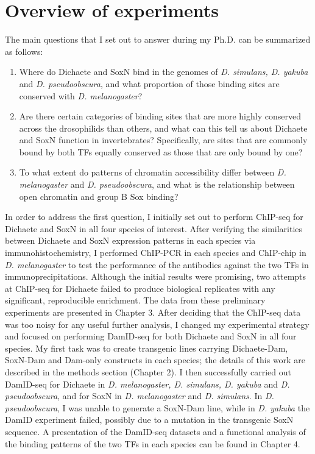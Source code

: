 \section{Overview of experiments}
The main questions that I set out to answer during my Ph.D. can be summarized as follows:
\begin{enumerate}
	\item Where do Dichaete and SoxN bind in the genomes of \emph{D. simulans, D. yakuba} and \emph{D. pseudoobscura}, and what proportion of those binding sites are conserved with \emph{D. melanogaster}?
	\item Are there certain categories of binding sites that are more highly conserved across the drosophilids than others, and what can this tell us about Dichaete and SoxN function in invertebrates? Specifically, are sites that are commonly bound by both TFs equally conserved as those that are only bound by one?
	\item To what extent do patterns of chromatin accessibility differ between \emph{D. melanogaster} and \emph{D. pseudoobscura}, and what is the relationship between open chromatin and group B Sox binding?
\end{enumerate}

In order to address the first question, I initially set out to perform ChIP-seq for Dichaete and SoxN in all four species of interest. After verifying the similarities between Dichaete and SoxN expression patterns in each species via immunohistochemistry, I performed ChIP-PCR in each species and ChIP-chip in \emph{D. melanogaster} to test the performance of the antibodies against the two TFs in immunoprecipitations. Although the initial results were promising, two attempts at ChIP-seq for Dichaete failed to produce biological replicates with any significant, reproducible enrichment. The data from these preliminary experiments are presented in Chapter 3. After deciding that the ChIP-seq data was too noisy for any useful further analysis, I changed my experimental strategy and focused on performing DamID-seq for both Dichaete and SoxN in all four species. My first task was to create transgenic lines carrying Dichaete-Dam, SoxN-Dam and Dam-only constructs in each species; the details of this work are described in the methods section (Chapter 2). I then successfully carried out DamID-seq for Dichaete in \emph{D. melanogaster, D. simulans, D. yakuba} and \emph{D. pseudoobscura}, and for SoxN in \emph{D. melanogaster} and \emph{D. simulans}. In \emph{D. pseudoobscura}, I was unable to generate a SoxN-Dam line, while in \emph{D. yakuba} the DamID experiment failed, possibly due to a mutation in the transgenic SoxN sequence. A presentation of the DamID-seq datasets and a functional analysis of the binding patterns of the two TFs in each species can be found in Chapter 4.

